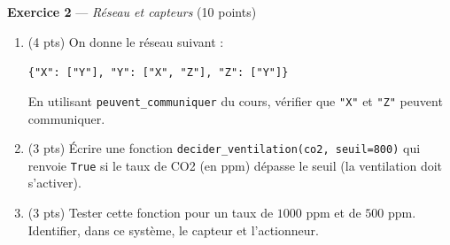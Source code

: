 \bigskip

\textbf{Exercice 2} --- \textit{Réseau et capteurs} \hfill (10 points)

\begin{enumerate}
  \item (4 pts) On donne le réseau suivant :
  \begin{center}\lstinline|{"X": ["Y"], "Y": ["X", "Z"], "Z": ["Y"]}|\end{center}
  En utilisant \lstinline{peuvent_communiquer} du cours, vérifier que \lstinline{"X"}
  et \lstinline{"Z"} peuvent communiquer.
  \item (3 pts) Écrire une fonction \lstinline{decider_ventilation(co2, seuil=800)} qui renvoie \lstinline{True} si le taux de CO2 (en ppm) dépasse le seuil (la ventilation doit s'activer).
  \item (3 pts) Tester cette fonction pour un taux de $1000$ ppm et de $500$ ppm. Identifier, dans ce système, le capteur et l'actionneur.
\end{enumerate}

